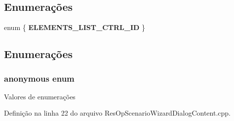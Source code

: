 \subsection*{Enumerações}
\begin{DoxyCompactItemize}
\item 
enum \{ {\bf E\+L\+E\+M\+E\+N\+T\+S\+\_\+\+L\+I\+S\+T\+\_\+\+C\+T\+R\+L\+\_\+\+ID}
 \}
\end{DoxyCompactItemize}


\subsection{Enumerações}
\subsubsection[{anonymous enum}]{\setlength{\rightskip}{0pt plus 5cm}anonymous enum}\label{_res_op_scenario_wizard_dialog_content_8cpp_adf764cbdea00d65edcd07bb9953ad2b7}
\begin{Desc}
\item[Valores de enumerações]\par
\begin{description}
\item[{\em 
E\+L\+E\+M\+E\+N\+T\+S\+\_\+\+L\+I\+S\+T\+\_\+\+C\+T\+R\+L\+\_\+\+ID\label{_res_op_scenario_wizard_dialog_content_8cpp_adf764cbdea00d65edcd07bb9953ad2b7ab98ff5342028c6956e8fc9b64c8753c1}
}]\end{description}
\end{Desc}


Definição na linha 22 do arquivo Res\+Op\+Scenario\+Wizard\+Dialog\+Content.\+cpp.

